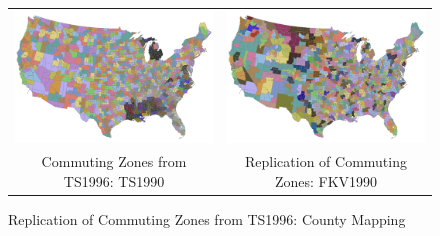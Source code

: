 

\begin{figure}[th]
\caption{Replication of Commuting Zones from TS1996: County Mapping}
\begin{tabular}{cc}
\includegraphics[width=.48\textwidth]{./figures/commutingzones.png}
&
\includegraphics[width=.48\textwidth]{./figures/replication.png}
\\
{Commuting Zones from TS1996: TS1990}
&
{Replication of Commuting Zones: FKV1990}
\\
\end{tabular}
\label{fig:czmaps}
\end{figure}
